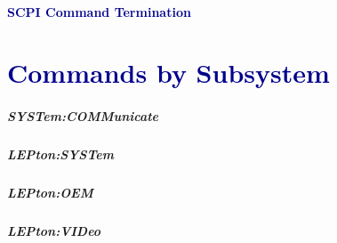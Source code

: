 \documentclass[10pt,a4paper]{article}
\begin{document}
\subsection*{\textcolor{darkblue}{SCPI Command Termination}}

\part*{\textcolor{darkblue}{Commands by Subsystem}}
\subsubsection*{SYSTem:COMMunicate}
\subsubsection*{LEPton:SYSTem}
\subsubsection*{LEPton:OEM}
\subsubsection*{LEPton:VIDeo}
\end{document}
